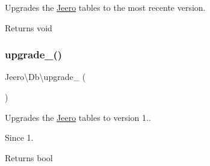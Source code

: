 Upgrades the \hyperlink{namespaceJeero}{Jeero} tables to the most recente version.

\begin{DoxyReturn}{Returns}
void 
\end{DoxyReturn}
\mbox{\label{namespaceJeero_1_1Db_aeeae82925ec06323d8a39bad5f79113e}} 
\subsubsection{\texorpdfstring{upgrade\+\_()}{upgrade\_100()}}
{\footnotesize\ttfamily Jeero\textbackslash{}\+Db\textbackslash{}upgrade\+\_ (\begin{DoxyParamCaption}{ }\end{DoxyParamCaption})}

Upgrades the \hyperlink{namespaceJeero}{Jeero} tables to version 1..

\begin{DoxySince}{Since}
1. 
\end{DoxySince}
\begin{DoxyReturn}{Returns}
bool 
\end{DoxyReturn}
